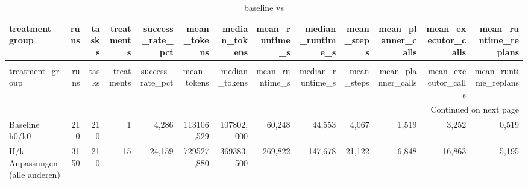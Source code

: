 \begin{longtable}{lrrrrrrrrrrrr}
\caption{baseline vs} \label{tab:baseline_vs} \\
\toprule
treatment\_group & runs & tasks & treatments & success\_rate\_pct & mean\_tokens & median\_tokens & mean\_runtime\_s & median\_runtime\_s & mean\_steps & mean\_planner\_calls & mean\_executor\_calls & mean\_runtime\_replans \\
\midrule
\endfirsthead
\caption[]{baseline vs} \\
\toprule
treatment\_group & runs & tasks & treatments & success\_rate\_pct & mean\_tokens & median\_tokens & mean\_runtime\_s & median\_runtime\_s & mean\_steps & mean\_planner\_calls & mean\_executor\_calls & mean\_runtime\_replans \\
\midrule
\endhead
\midrule
\multicolumn{13}{r}{Continued on next page} \\
\midrule
\endfoot
\bottomrule
\endlastfoot
Baseline h0/k0 & 210 & 210 & 1 & 4,286 & 113106,529 & 107802,000 & 60,248 & 44,553 & 4,067 & 1,519 & 3,252 & 0,519 \\
H/k-Anpassungen (alle anderen) & 3150 & 210 & 15 & 24,159 & 729527,880 & 369383,500 & 269,822 & 147,678 & 21,122 & 6,848 & 16,863 & 5,195 \\
\end{longtable}
